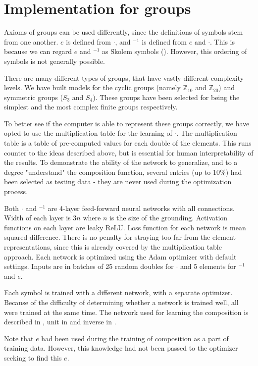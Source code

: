 \section{Implementation for groups}
\label{section:group_impl}
Axioms of groups can be used differently, since the definitions of symbols stem from one another. $e$ is defined from $\cdot$, and $^{-1}$ is defined from $e$ and $\cdot$. This is because we can regard $e$ and $^{-1}$ as Skolem symbols (). However, this ordering of symbols is not generally possible.

There are many different types of groups, that have vastly different complexity levels. We have built models for the cyclic groups (namely $\mathbb{Z}_{10}$ and $\mathbb{Z}_{20}$) and symmetric groups ($S_3$ and $S_4$). These groups have been selected for being the simplest and the most complex finite groups respectively.

To better see if the computer is able to represent these groups correctly, we have opted to use the multiplication table for the learning of $\cdot$. The multiplication table is a table of pre-computed values for each double of the elements. This runs counter to the ideas described above, but is essential for human interpretability of the results. To demonstrate the ability of the network to generalize, and to a degree "understand" the composition function, several entries (up to 10\%) had been selected as testing data - they are never used during the optimization process.

Both $\cdot$ and $^{-1}$ are 4-layer feed-forward neural networks with all connections. Width of each layer is $3n$ where $n$ is the size of the grounding. Activation functions on each layer are leaky ReLU. Loss function for each network is mean squared difference. There is no penalty for straying too far from the element representations, since this is already covered by the multiplication table approach. Each network is optimized using the Adam optimizer with default settings. Inputs are in batches of 25 random doubles for $\cdot$ and 5 elements for $^{-1}$ and $e$. 

Each symbol is trained with a different network, with a separate optimizer. Because of the difficulty of determining whether a network is trained well, all were trained at the same time. The network used for learning the composition is described in , unit in  and inverse in . 

Note that $e$ had been used during the training of composition as a part of training data. However, this knowledge had not been passed to the optimizer seeking to find this $e$.

